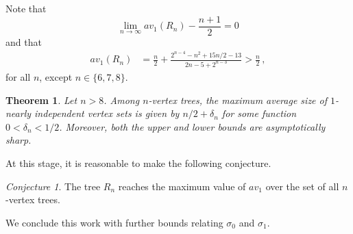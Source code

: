 \documentclass[a4paper,12pt]{amsart}
\newtheorem{theorem}[lemma]{Theorem}
\theoremstyle{remark}
\newtheorem{conjecture}{Conjecture}
\begin{document}

Note that 
$$
\lim_{n\to \infty}av_1(R_n)-\frac{n+1}{2} =0
$$ 
and that
\begin{align}
av_1(R_n) &=\frac{n}{2}+\frac{2^{n-4}- n^2+15n/2-13}{2n-5+2^{n-3}}\nonumber > \frac{n}{2}\,,
\label{Eq:Minfn}
\end{align}
for all $n$, except $n\in \{6,7,8\}$.

\begin{theorem}
Let $n>8$. Among $n$-vertex trees, the maximum average size of $1$-nearly independent vertex sets is given by $n/2 + \delta_n$ for some function $0< \delta_n <1/2$. Moreover, both the upper and lower bounds are asymptotically sharp.
\end{theorem}

\medskip
At this stage, it is reasonable to make the following conjecture.

\begin{conjecture}
The tree $R_n$ reaches the maximum value of $av_1$ over the set of all $n$-vertex trees.
\end{conjecture}

\medskip
We conclude this work with further bounds relating $\sigma_0$ and $\sigma_1$.






\end{document}
